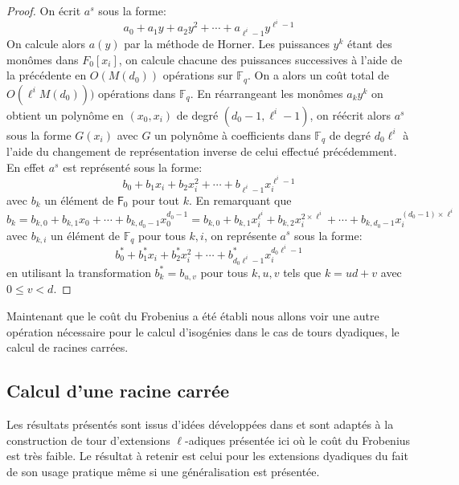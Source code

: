 \documentclass[10pt,a4paper]{book}
\theoremstyle{plain}
\theoremstyle{definition}
\theoremstyle{definition}
\theoremstyle{definition}
\theoremstyle{definition}
\theoremstyle{remark}
\theoremstyle{remark}
\theoremstyle{definition}
\begin{document}
\begin{proof}
On écrit $a^s$ sous la forme:
\begin{equation*}
a_0 + a_1 y + a_2 y^2 + \cdots + a_{\ell^i-1}y^{\ell^i-1}
\end{equation*}
On calcule alors $a(y)$ par la méthode de Horner. Les puissances $y^k$ étant des monômes dans $F_0[x_i]$, on calcule chacune des puissances successives à l'aide de la précédente en $O(M(d_0))$ opérations sur $\mathbb{F}_q$. On a alors un coût total de $O(\ell^{i}M(d_0)))$ opérations dans $\mathbb{F}_q$. En réarrangeant les monômes $a_k y^k$ on obtient un polynôme en $(x_0,x_i)$ de degré $(d_0-1,\ell^i-1)$, on réécrit alors $a^s$ sous la forme $G(x_i)$ avec $G$ un polynôme à coefficients dans $\mathbb{F}_q$ de degré $d_0\ell^i$  à l'aide du changement de représentation inverse de celui effectué précédemment. En effet $a^s$ est représenté sous la forme:
\begin{equation*}
b_0 + b_1 x_i + b_2 x_i^2 + \cdots + b_{\ell^i-1}x_i^{\ell^i-1}
\end{equation*}
avec $b_k$ un élément de $\mathsf{F}_0$ pour tout $k$. En remarquant que
\begin{equation*}
 b_k=b_{k,0} + b_{k,1}x_0 + \cdots + b_{k,d_0-1} x_0^{d_0-1}=b_{k,0} + b_{k,1}x_i^{\ell^i} + b_{k,2} x_i^{2 \times \ell^i} + \cdots + b_{k,d_0-1} x_i^{(d_0-1)\times \ell^i} 
\end{equation*}
 avec $b_{k,i}$ un élément de $\mathbb{F}_q$ pour tous $k,i$, on représente $a^s$ sous la forme:
\begin{equation*}
b_0^* + b_1^* x_i + b^*_2 x_i^2 + \cdots + b^*_{d_0\ell^i-1} x_i^{d_0\ell^i-1}
\end{equation*}
 en  utilisant la transformation $b_k^*=b_{u,v}$ pour tous $k,u,v$ tels que $k=ud+v$ avec $0 \leqslant v < d$.
\end{proof}

Maintenant que le coût du Frobenius a été établi nous allons voir une autre opération nécessaire pour le calcul d'isogénies dans le cas de tours dyadiques, le calcul de racines carrées.

\subsection*{Calcul d'une racine carrée}
Les résultats présentés sont issus d'idées développées dans \cite{Doliskani-Schost14} et sont adaptés à la construction de tour d'extensions $\ell$-adiques présentée ici où le coût du Frobenius est très faible. Le résultat à retenir est celui pour les extensions dyadiques du fait de son usage pratique même si une généralisation est présentée. 
\end{document}
